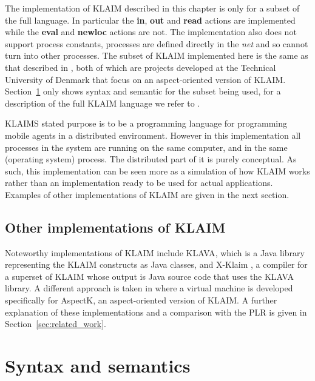	The implementation of KLAIM described in this chapter is only for a subset 
	of the full language. In particular the \textbf{in}, \textbf{out} and 
	\textbf{read} actions are implemented while the \textbf{eval} and 
	\textbf{newloc} actions are not. The implementation also does not support 
	process constants, processes are defined directly in the \textit{net} and so 
	cannot turn into other processes. The subset of KLAIM implemented here is 
	the same as that described in \cite{aspectk, giordano}, both of which are
	projects developed at the Technical University of Denmark that focus on an 
	aspect-oriented version of KLAIM. Section~\ref{sec:klaim_syntax} only shows 
	syntax and semantic for the subset being used, for a description of the full 
	KLAIM language we refer to \cite{klaim}. 
	
	KLAIMS stated purpose is to be a programming language for programming mobile 
	agents in a distributed environment. However in this implementation all 
	processes in the system are running on the same computer, and in the same 
	(operating system) process. The distributed part of it is purely conceptual. 
	As such, this implementation can be seen more as a simulation of how KLAIM 
	works rather than an implementation ready to be used for actual 
	applications. Examples of other implementations of KLAIM are given in the 
	next section.
		
	\subsection{Other implementations of KLAIM}
		
	Noteworthy implementations of KLAIM include KLAVA\cite{klava}, which is a 
	Java library representing the KLAIM constructs as Java classes, and X-Klaim 
	\cite{xklaim}, a compiler for a superset of KLAIM whose output is Java 
	source code that uses the KLAVA library. A different approach is taken in 
	\cite{giordano} where a virtual machine is developed specifically for 
	AspectK, an aspect-oriented version of KLAIM. A further explanation of these 
	implementations and a comparison with the PLR is given in 
	Section~\ref{sec:related_work}. 

\section{Syntax and semantics}\label{sec:klaim_syntax}
	
